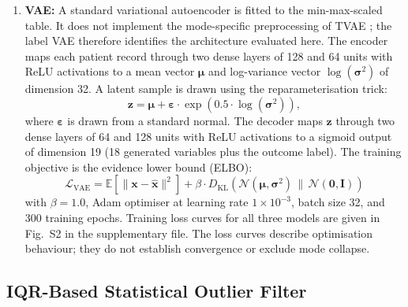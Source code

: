 \begin{enumerate}
\item {\textbf {VAE:}} A standard variational autoencoder is fitted to the min-max-scaled table. It does not implement the mode-specific preprocessing of TVAE \cite{xu2019}; the label VAE therefore identifies the architecture evaluated here. The encoder maps each patient record through two dense layers of 128 and 64 units with ReLU activations to a mean vector $\boldsymbol{\mu}$ and log-variance vector $\log(\boldsymbol{\sigma}^2)$ of dimension 32. A latent sample is drawn using the reparameterisation trick:
\begin{equation}
\mathbf{z} = \boldsymbol{\mu} + \boldsymbol{\varepsilon} \cdot \exp(0.5 \cdot \log(\boldsymbol{\sigma}^2)),
\end{equation}
where $\boldsymbol{\varepsilon}$ is drawn from a standard normal. The decoder maps $\mathbf{z}$ through two dense layers of 64 and 128 units with ReLU activations to a sigmoid output of dimension 19 (18 generated variables plus the outcome label). The training objective is the evidence lower bound (ELBO):
\begin{equation}
\mathcal{L}_{\text{VAE}} = \mathbb{E}\!\left[\|\mathbf{x} - \hat{\mathbf{x}}\|^2\right] + \beta \cdot D_{\text{KL}}\!\left(\mathcal{N}(\boldsymbol{\mu}, \boldsymbol{\sigma}^2) \,\|\, \mathcal{N}(\mathbf{0}, \mathbf{I})\right)
\end{equation}
with $\beta = 1.0$, Adam optimiser at learning rate $1 \times 10^{-3}$, batch size 32, and 300 training epochs. Training loss curves for all three models are given in Fig.~S2 in the supplementary file. The loss curves describe optimisation behaviour; they do not establish convergence or exclude mode collapse.
\end{enumerate}
\endgroup

\subsection{IQR-Based Statistical Outlier Filter}


